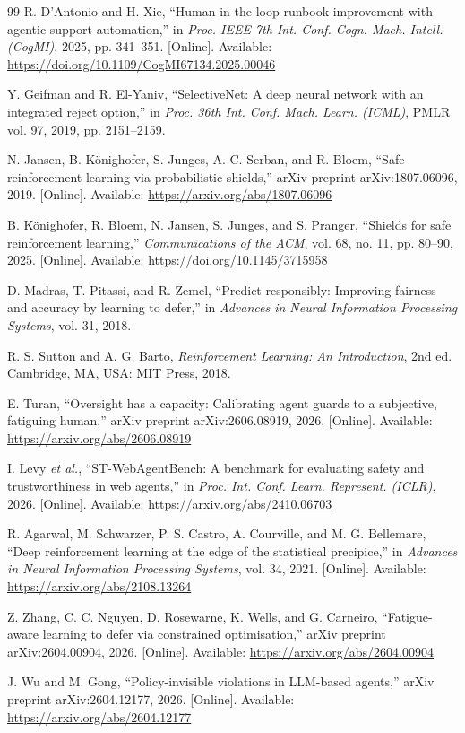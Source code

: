 \documentclass[12pt,a4paper]{article}
\begin{document}
\begin{thebibliography}{99}
 R. D'Antonio and H. Xie, ``Human-in-the-loop runbook improvement with agentic support automation,'' in \emph{Proc. IEEE 7th Int. Conf. Cogn. Mach. Intell. (CogMI)}, 2025, pp. 341--351. [Online]. Available: \url{https://doi.org/10.1109/CogMI67134.2025.00046}

 Y. Geifman and R. El-Yaniv, ``SelectiveNet: A deep neural network with an integrated reject option,'' in \emph{Proc. 36th Int. Conf. Mach. Learn. (ICML)}, PMLR vol. 97, 2019, pp. 2151--2159.

 N. Jansen, B. K\"{o}nighofer, S. Junges, A. C. Serban, and R. Bloem, ``Safe reinforcement learning via probabilistic shields,'' arXiv preprint arXiv:1807.06096, 2019. [Online]. Available: \url{https://arxiv.org/abs/1807.06096}

 B. K\"{o}nighofer, R. Bloem, N. Jansen, S. Junges, and S. Pranger, ``Shields for safe reinforcement learning,'' \emph{Communications of the ACM}, vol. 68, no. 11, pp. 80--90, 2025. [Online]. Available: \url{https://doi.org/10.1145/3715958}

 D. Madras, T. Pitassi, and R. Zemel, ``Predict responsibly: Improving fairness and accuracy by learning to defer,'' in \emph{Advances in Neural Information Processing Systems}, vol. 31, 2018.

 R. S. Sutton and A. G. Barto, \emph{Reinforcement Learning: An Introduction}, 2nd ed. Cambridge, MA, USA: MIT Press, 2018.

 E. Turan, ``Oversight has a capacity: Calibrating agent guards to a subjective, fatiguing human,'' arXiv preprint arXiv:2606.08919, 2026. [Online]. Available: \url{https://arxiv.org/abs/2606.08919}

 I. Levy \emph{et al.}, ``ST-WebAgentBench: A benchmark for evaluating safety and trustworthiness in web agents,'' in \emph{Proc. Int. Conf. Learn. Represent. (ICLR)}, 2026. [Online]. Available: \url{https://arxiv.org/abs/2410.06703}

 R. Agarwal, M. Schwarzer, P. S. Castro, A. Courville, and M. G. Bellemare, ``Deep reinforcement learning at the edge of the statistical precipice,'' in \emph{Advances in Neural Information Processing Systems}, vol. 34, 2021. [Online]. Available: \url{https://arxiv.org/abs/2108.13264}

 Z. Zhang, C. C. Nguyen, D. Rosewarne, K. Wells, and G. Carneiro, ``Fatigue-aware learning to defer via constrained optimisation,'' arXiv preprint arXiv:2604.00904, 2026. [Online]. Available: \url{https://arxiv.org/abs/2604.00904}

 J. Wu and M. Gong, ``Policy-invisible violations in LLM-based agents,'' arXiv preprint arXiv:2604.12177, 2026. [Online]. Available: \url{https://arxiv.org/abs/2604.12177}

\end{thebibliography}
\end{document}
